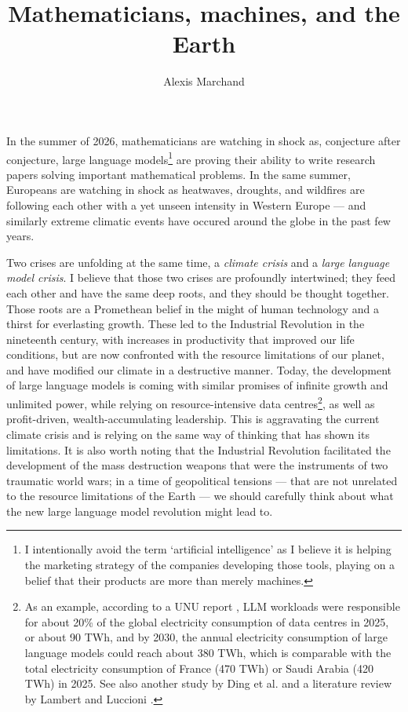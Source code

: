 \documentclass[a4paper,12pt]{article}
\title{Mathematicians, machines, and the Earth}
\author{Alexis Marchand}
\begin{document}
	\maketitle
	
	In the summer of 2026, mathematicians are watching in shock as, conjecture after conjecture, large language models\footnote{I intentionally avoid the term `artificial intelligence' as I believe it is helping the marketing strategy of the companies developing those tools, playing on a belief that their products are more than merely machines.} are proving their ability to write research papers solving important mathematical problems.
	In the same summer, Europeans are watching in shock as heatwaves, droughts, and wildfires are following each other with a yet unseen intensity in Western Europe --- and similarly extreme climatic events have occured around the globe in the past few years.
	
	Two crises are unfolding at the same time, a \emph{climate crisis} and a \emph{large language model crisis}.
	I believe that those two crises are profoundly intertwined; they feed each other and have the same deep roots, and they should be thought together.
	Those roots are a Promethean belief in the might of human technology and a thirst for everlasting growth.
	These led to the Industrial Revolution in the nineteenth century, with increases in productivity that improved our life conditions, but are now confronted with the resource limitations of our planet, and have modified our climate in a destructive manner.
	Today, the development of large language models is coming with similar promises of infinite growth and unlimited power, while relying on resource-intensive data centres\footnote{As an example, according to a UNU report \cite{unu}, LLM workloads were responsible for about 20\% of the global electricity consumption of data centres in 2025, or about 90 TWh, and by 2030, the annual electricity consumption of large language models could reach about 380 TWh, which is comparable with the total electricity consumption of France (470 TWh) or Saudi Arabia (420 TWh) in 2025. See also another study by Ding et al. \cite{ding-etal} and a literature review by Lambert and Luccioni \cite{lambert-luccioni}.}, as well as profit-driven, wealth-accumulating leadership.
	This is aggravating the current climate crisis and is relying on the same way of thinking that has shown its limitations.
	It is also worth noting that the Industrial Revolution facilitated the development of the mass destruction weapons that were the instruments of two traumatic world wars; in a time of geopolitical tensions --- that are not unrelated to the resource limitations of the Earth --- we should carefully think about what the new large language model revolution might lead to.
	
\end{document}
